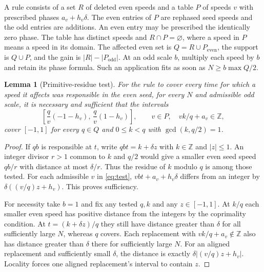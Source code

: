 \documentclass[11pt]{article}
\newtheorem{lemma}[theorem]{Lemma}
\theoremstyle{definition}
\newcommand{\Z}{\mathbb{Z}}
\begin{document}
A rule consists of a set \(R\) of deleted even speeds and a table \(P\)
of speeds \(v\) with prescribed phases \(a_v+h_v\delta\). The even entries
of \(P\) are rephased seed speeds and the odd entries are additions.
An even entry may be prescribed the identically zero phase.
The table has distinct speeds and \(R\cap P=\varnothing\), where a speed
in \(P\) means a speed in its domain. The affected even set is
\(Q=R\cup P_{\mathrm{even}}\), the support is \(Q\cup P\), and the gain
is \(|R|-|P_{\mathrm{odd}}|\).
At an odd scale \(b\), multiply each speed by \(b\) and retain its
phase formula. Such an application fits as soon as \(N\ge b\max Q/2\).

\begin{lemma}[Primitive-residue test]\label{lem:primitive}
For the rule to cover every time for which a speed it affects was
responsible in the even seed, for every \(N\) and admissible odd scale,
it is necessary and sufficient that the intervals
\[
 \left[\frac qv(-1-h_v),\,\frac qv(1-h_v)\right],
 \qquad v\in P,\quad vk/q+a_v\in\Z ,
 \tag{1}\label{eq:test}
\]
cover \([-1,1]\) for every \(q\in Q\) and \(0\le k<q\)
with \(\gcd(k,q/2)=1\).
\end{lemma}
\begin{proof}
If \(qb\) is responsible at \(t\), write \(qbt=k+\delta z\) with
\(k\in\Z\) and \(|z|\le1\). An integer divisor \(r>1\) common to \(k\)
and \(q/2\) would give a smaller even seed speed \(qb/r\) with distance
at most \(\delta/r\). Thus the residue of \(k\) modulo \(q\) is among
those tested. For each admissible \(v\) in \eqref{eq:test},
\(vbt+a_v+h_v\delta\) differs from an integer by
\(\delta((v/q)z+h_v)\). This proves sufficiency.

For necessity take \(b=1\) and fix any tested \(q,k\) and any
\(z\in[-1,1]\). At \(k/q\) each smaller even speed has positive distance
from the integers by the coprimality condition. At
\(t=(k+\delta z)/q\) they still have distance greater than \(\delta\)
for all sufficiently large \(N\), whereas \(q\) covers. Each replacement
with \(vk/q+a_v\notin\Z\) also has distance greater than \(\delta\)
there for sufficiently large \(N\).
For an aligned replacement and sufficiently small \(\delta\), the
distance is exactly \(\delta|(v/q)z+h_v|\).
Locality forces one aligned replacement's interval to contain \(z\).
\end{proof}
\end{document}
